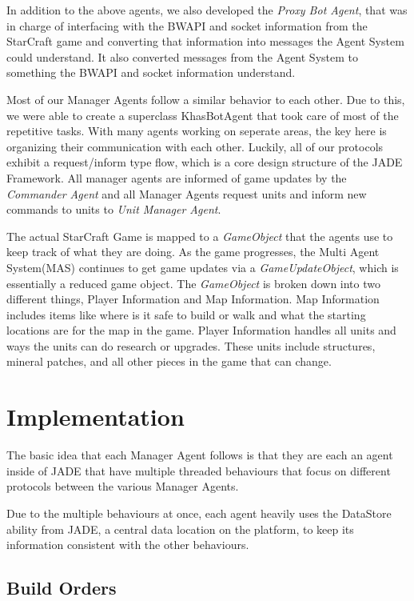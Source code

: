 \documentclass[letterpaper]{article}
\begin{document}
In addition to the above agents, we also developed the \emph{Proxy Bot Agent}, that was in charge of interfacing with the BWAPI and socket information from the StarCraft game and converting that information into messages the Agent System could understand.  It also converted messages from the Agent System to something the BWAPI and socket information understand.

Most of our Manager Agents follow a similar behavior to each other. Due to this, we were able to create a superclass KhasBotAgent that took care of most of the repetitive tasks.  With many agents working on seperate areas, the key here is organizing their communication with each other.  Luckily, all of our protocols exhibit a request/inform type flow, which is a core design structure of the JADE Framework.  All manager agents are informed of game updates by the \emph{Commander Agent} and all Manager Agents request units and inform new commands to units to \emph{Unit Manager Agent}.

The actual StarCraft Game is mapped to a \emph{GameObject} that the agents use to keep track of what they are doing.  As the game progresses, the Multi Agent System(MAS) continues to get game updates via a \emph{GameUpdateObject}, which is essentially a reduced game object.  The \emph{GameObject} is broken down into two different things, Player Information and Map Information. Map Information includes items like where is it safe to build or walk and what the starting locations are for the map in the game.  Player Information handles all units and ways the units can do research or upgrades.  These units include structures, mineral patches, and all other pieces in the game that can change.

\section{Implementation}
The basic idea that each Manager Agent follows is that they are each an agent inside of JADE that have multiple threaded behaviours that focus on different protocols between the various Manager Agents.

Due to the multiple behaviours at once, each agent heavily uses the DataStore ability from JADE, a central data location on the platform, to keep its information consistent with the other behaviours.

\subsection{Build Orders}
\end{document}
